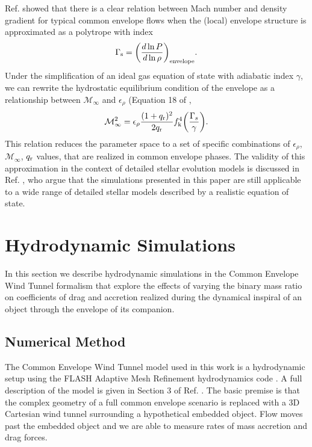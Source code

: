 Ref. \cite{MacLeod:2017} showed that there is a clear relation between Mach number and density gradient for typical common envelope flows when the (local) envelope structure is approximated as a polytrope with index 
\begin{equation}
\Gamma_{\rm s} = \bigg(\frac{d\ln{P}}{d\ln{\rho}}\bigg)_{\rm envelope}.
\end{equation}
Under the simplification of an ideal gas equation of state with adiabatic index $\gamma$, we can rewrite the hydrostatic equilibrium condition of the envelope as a relationship between $\mathcal{M}_\infty$ and $\epsilon_\rho$ (Equation 18 of \cite{MacLeod:2017}, 
\begin{equation}\label{eq:mach-erho}
\mathcal{M}^2_\infty = \epsilon_\rho \frac{(1 + q_{\rm r})^2}{2q_{\rm r}}f_{\rm k}^4 \bigg(\frac{\Gamma_s}{\gamma}\bigg).
\end{equation}
This relation reduces the parameter space to a set of specific combinations of $\epsilon_\rho$, $\mathcal{M}_\infty$, $q_{\rm r}$ values, that are realized in common envelope phases.
The validity of this approximation in the context of detailed stellar evolution models  is  discussed  in Ref. \cite{Rosa:2020}, who argue that the simulations presented in this paper are still applicable to a wide range of detailed stellar models described by a realistic equation of state.

\vspace{0.5cm}
\section{Hydrodynamic Simulations\label{sec:hydro_sims}}
In this section we describe hydrodynamic simulations in the Common Envelope Wind Tunnel formalism \cite{MacLeod:2017} that explore the effects of varying the binary mass ratio on coefficients of drag and accretion realized during the dynamical inspiral of an object through the envelope of its companion.  

\subsection{Numerical Method}\label{sec:method}
The Common Envelope Wind Tunnel model used in this work is a hydrodynamic setup using the FLASH Adaptive Mesh Refinement hydrodynamics code \cite{Fryxell2000}. A full description of the model is given in Section 3 of Ref. \cite{MacLeod:2017}. The basic premise is that the complex geometry of a full common envelope scenario is replaced with a 3D Cartesian wind tunnel surrounding a hypothetical embedded object. Flow moves past the embedded object and we are able to measure rates of mass accretion and drag forces. 

